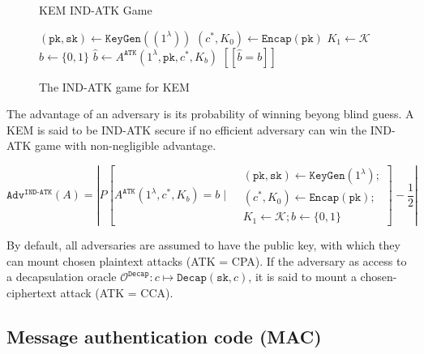 \documentclass[runningheads]{llncs}
\newcommand{\keygen}{\texttt{KeyGen}}
\newcommand{\encap}{\texttt{Encap}}
\newcommand{\decap}{\texttt{Decap}}
\newcommand{\pk}{\texttt{pk}}
\newcommand{\sk}{\texttt{sk}}
\newcommand{\llbrack}{[\![}
\newcommand{\rrbrack}{]\!]}
\begin{document}
\begin{figure}[h]
    \centering
    \begin{minipage}[t]{0.5\textwidth}
        \begin{algorithm}[H]
            \caption*{KEM IND-ATK Game}
            \begin{algorithmic}[1]
                \State $(\pk, \sk) \leftarrow \keygen((1^\lambda))$
                \State $(c^\ast, K_0) \leftarrow \encap(\pk)$
                \State $K_1 \leftarrow \mathcal{K}$
                \State $b \leftarrow \{0,1\}$
                \State $\hat{b} \leftarrow A^\texttt{ATK}(1^\lambda, \pk, c^\ast, K_b)$
                \State \Return $\llbrack \hat{b} = b \rrbrack$
            \end{algorithmic}
        \end{algorithm}
    \end{minipage}
    \caption{The IND-ATK game for KEM}\label{fig:kem-ind-atk-game}
\end{figure}

The advantage of an adversary is its probability of winning beyong blind guess. A KEM is said to be IND-ATK secure if no efficient adversary can win the IND-ATK game with non-negligible advantage.

$$
\texttt{Adv}^\texttt{IND-ATK}(A) = \left\vert P\left[
    A^\texttt{ATK}(1^\lambda, c^\ast, K_b) = b
    \mid \begin{aligned}
    &(\pk, \sk) \leftarrow \keygen(1^\lambda); \\
    &(c^\ast, K_0) \leftarrow \encap(\pk); \\
    &K_1 \leftarrow \mathcal{K}; b \leftarrow \{0,1\}
    \end{aligned}
\right] - \frac{1}{2}
\right\vert
$$

By default, all adversaries are assumed to have the public key, with which they can mount chosen plaintext attacks (ATK = CPA). If the adversary as access to a decapsulation oracle $\mathcal{O}^\decap: c \mapsto \decap(\sk, c)$, it is said to mount a chosen-ciphertext attack (ATK = CCA).

\subsection{Message authentication code (MAC)}\label{sec:message-authentication-code}
\end{document}

